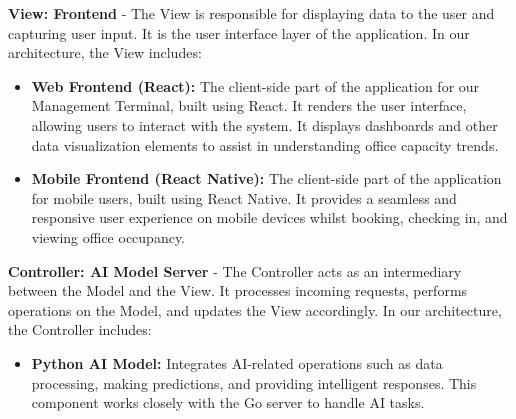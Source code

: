 \documentclass[11pt,a4paper]{article}
\begin{document}
\textbf{View: Frontend} - The View is responsible for displaying data to the user and capturing user input. It is the user interface layer of the application. In our architecture, the View includes:
\begin{itemize}
    \item \textbf{Web Frontend (React):} The client-side part of the application for our Management Terminal, built using React. It renders the user interface, allowing users to interact with the system. It displays dashboards and other data visualization elements to assist in understanding office capacity trends.
    \item \textbf{Mobile Frontend (React Native):} The client-side part of the application for mobile users, built using React Native. It provides a seamless and responsive user experience on mobile devices whilst booking, checking in, and viewing office occupancy.
\end{itemize}

\textbf{Controller: AI Model Server} - The Controller acts as an intermediary between the Model and the View. It processes incoming requests, performs operations on the Model, and updates the View accordingly. In our architecture, the Controller includes:
\begin{itemize}
    \item \textbf{Python AI Model:} Integrates AI-related operations such as data processing, making predictions, and providing intelligent responses. This component works closely with the Go server to handle AI tasks.
\end{itemize}
\end{document}
